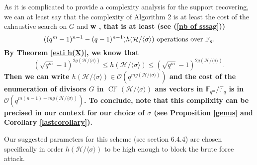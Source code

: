 \documentclass[10pt]{article}
\newcommand{\s}{\vspace{0.3cm}}
\newcommand{\calH}{\mathcal{H}}
\newcommand{\fqm}{\mathbb{F}_{q^m}}
\newcommand{\fq}{\mathbb{F}_q}
\newcommand{\Cl}{\operatorname{Cl}}
\begin{document}
\s

As it is complicated to provide a complexity analysis for the support recovering, we can at least say that the complexity of Algorithm 2 is at least the cost of the exhaustive search on $G$ and \bf{w} \rm, that is at least (see (\ref{nb of sssag}))
\[ ((q^m-1)^{n-1}-(q-1)^{n-1})h(\mathcal{H}/\langle \sigma \rangle) \rm \ operations \ over \ \it \fq.\]
By Theorem \ref{esti h(X)}, we know that 
\[(\sqrt{q^m}-1)^{2g(\mathcal{H}/\langle \sigma \rangle)} \leq h(\mathcal{H}/\langle \sigma \rangle) \leq (\sqrt{q^m}-1)^{2g(\mathcal{H}/\langle \sigma \rangle)}.\] 
Then we can write $h(\mathcal{H}/\langle \sigma \rangle) \in \mathcal{O}(q^{mg(\mathcal{H}/\langle \sigma \rangle)})$ and the cost of the enumeration of divisors $G$ in $\Cl^r(\mathcal{H}/\langle \sigma \rangle)$ ans vectors in $\fqm/\fq$ is in $\mathcal{O}(q^{m(n-1)+mg(\mathcal{H}/\langle \sigma \rangle)})$. 
To conclude, note that this complixity can be precised in our context for our choice of $\sigma$ (see Proposition \ref{genus} and Corollary \ref{lastcorollary}).

Our suggested parameters for this scheme (see section 6.4.4) are chosen specifically in order $h(\calH/\langle \sigma \rangle)$ to be high enough to block the brute force attack.










\newpage


\end{document}
